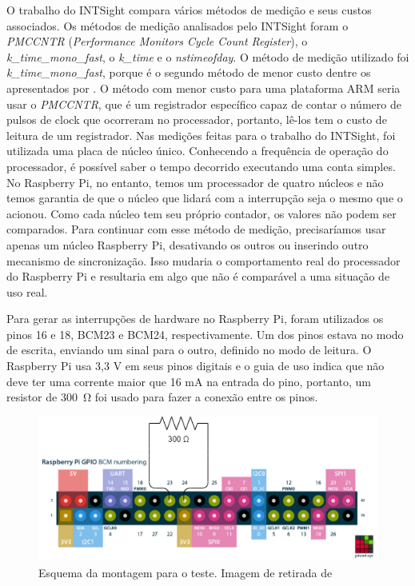O trabalho do INTSight compara vários métodos de medição e seus custos associados. Os métodos de medição analisados pelo INTSight foram o \textit{PMCCNTR} (\textit{Performance Monitors Cycle Count Register}), o \textit{k\_time\_mono\_fast}, o \textit{k\_time} e o \textit{nstimeofday}. O método de medição utilizado foi \textit{k\_time\_mono\_fast}, porque é o segundo método de menor custo dentre os apresentados por \cite{Gerhorst2018}. O método com menor custo para uma plataforma ARM seria usar o \textit{PMCCNTR}, que é um registrador específico capaz de contar o número de pulsos de clock que ocorreram no processador, portanto, lê-los tem o custo de leitura de um registrador. Nas medições feitas para o trabalho do INTSight, foi utilizada uma placa de núcleo único. Conhecendo a frequência de operação do processador, é possível saber o tempo decorrido executando uma conta simples. No Raspberry Pi, no entanto, temos um processador de quatro núcleos e não temos garantia de que o núcleo que lidará com a interrupção seja o mesmo que o acionou. Como cada núcleo tem seu próprio contador, os valores não podem ser comparados. Para continuar com esse método de medição, precisaríamos usar apenas um núcleo Raspberry Pi, desativando os outros ou inserindo outro mecanismo de sincronização. Isso mudaria o comportamento real do processador do Raspberry Pi e resultaria em algo que não é comparável a uma situação de uso real.

Para gerar as interrupções de hardware no Raspberry Pi, foram utilizados os pinos 16 e 18, BCM23 e BCM24, respectivamente. Um dos pinos estava no modo de escrita, enviando um sinal para o outro, definido no modo de leitura. O Raspberry Pi usa 3,3 V em seus pinos digitais e o guia de uso indica que não deve ter uma corrente maior que 16 mA na entrada do pino, portanto, um resistor de \SI{300}{\ohm} foi usado para fazer a conexão entre os pinos.

\begin{figure}[!htb]
\centering
\includegraphics[width = \textwidth]{photos/raspberry-pins.png}
\caption{Esquema da montagem para o teste. Imagem de retirada de \cite{pinout}}
\label{grafic:Preempt}
\end{figure}
